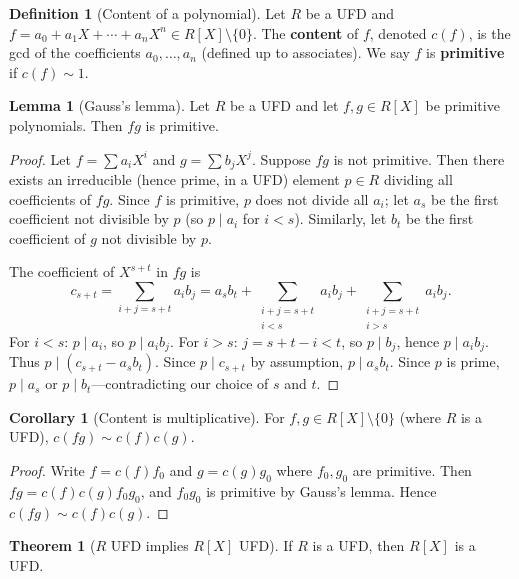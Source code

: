 \documentclass[12pt,a4paper,openany]{book}
\theoremstyle{definition}
\newtheorem{definition}{Definition}[chapter]
\newtheorem{theorem}{Theorem}[chapter]
\newtheorem{lemma}{Lemma}[chapter]
\newtheorem{corollary}{Corollary}[chapter]
\theoremstyle{remark}
\begin{document}
\begin{definition}[Content of a polynomial]\label{def:content}
Let $R$ be a UFD and $f=a_0+a_1X+\cdots+a_nX^n\in R[X]\setminus\{0\}$. The \textbf{content} of $f$, denoted $c(f)$, is the gcd of the coefficients $a_0,\ldots,a_n$ (defined up to associates). We say $f$ is \textbf{primitive} if $c(f)\sim 1$.
\end{definition}

\begin{lemma}[Gauss's lemma]\label{lem:gauss}
Let $R$ be a UFD and let $f,g\in R[X]$ be primitive polynomials. Then $fg$ is primitive.
\end{lemma}

\begin{proof}
Let $f=\sum a_iX^i$ and $g=\sum b_jX^j$. Suppose $fg$ is not primitive. Then there exists an irreducible (hence prime, in a UFD) element $p\in R$ dividing all coefficients of $fg$. Since $f$ is primitive, $p$ does not divide all $a_i$; let $a_s$ be the first coefficient not divisible by $p$ (so $p\mid a_i$ for $i<s$). Similarly, let $b_t$ be the first coefficient of $g$ not divisible by $p$.

The coefficient of $X^{s+t}$ in $fg$ is
\[
    c_{s+t}=\sum_{i+j=s+t}a_ib_j = a_sb_t + \sum_{\substack{i+j=s+t\\i<s}}a_ib_j + \sum_{\substack{i+j=s+t\\i>s}}a_ib_j.
\]
For $i<s$: $p\mid a_i$, so $p\mid a_ib_j$. For $i>s$: $j=s+t-i<t$, so $p\mid b_j$, hence $p\mid a_ib_j$. Thus $p\mid(c_{s+t}-a_sb_t)$. Since $p\mid c_{s+t}$ by assumption, $p\mid a_sb_t$. Since $p$ is prime, $p\mid a_s$ or $p\mid b_t$---contradicting our choice of $s$ and $t$.
\end{proof}

\begin{corollary}[Content is multiplicative]\label{cor:content-multiplicative}
For $f,g\in R[X]\setminus\{0\}$ (where $R$ is a UFD), $c(fg)\sim c(f)c(g)$.
\end{corollary}

\begin{proof}
Write $f=c(f)f_0$ and $g=c(g)g_0$ where $f_0,g_0$ are primitive. Then $fg=c(f)c(g)f_0g_0$, and $f_0g_0$ is primitive by Gauss's lemma. Hence $c(fg)\sim c(f)c(g)$.
\end{proof}

\begin{theorem}[{$R$ UFD implies $R[X]$ UFD}]\label{thm:UFD-polynomial}
If $R$ is a UFD, then $R[X]$ is a UFD.
\end{theorem}
\end{document}
